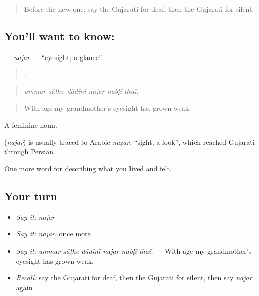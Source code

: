 \begin{quote}
Before the new one: say the Gujarati for deaf, then the Gujarati for silent.
\end{quote}

\subsection*{You'll want to know: }
\textbf{} — \emph{najar} — \textquotedblleft{}eyesight; a glance\textquotedblright{}.

\begin{quote}
     .
\end{quote}

\begin{quote}
\emph{ummar sāthe dādīnī najar nabḷī thaī.}
\end{quote}

\begin{quote}
With age my grandmother's eyesight has grown weak.
\end{quote}

A feminine noun.

\begin{cousinweb}
\textbf{} (\emph{najar}) is usually traced to Arabic \emph{naẓar}, \textquotedblleft{}sight, a look\textquotedblright{}, which reached Gujarati through Persian.
\end{cousinweb}

\begin{grammarlens}[title={What you've built}]
One more word for describing what you lived and felt.
\end{grammarlens}

\subsection*{Your turn}
\begin{itemize}
\raggedright
  \item \emph{Say it:} \emph{najar}
  \item \emph{Say it:} \emph{najar}, once more
  \item \emph{Say it:} \emph{ummar sāthe dādīnī najar nabḷī thaī.} — With age my grandmother's eyesight has grown weak.
  \item \emph{Recall:} say the Gujarati for deaf, then the Gujarati for silent, then say \emph{najar} again
\end{itemize}

